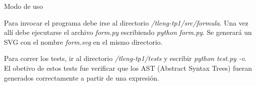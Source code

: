 \begin{section}{Modo de uso}

Para invocar el programa debe irse al directorio \textit{/tleng-tp1/src/formula}. Una vez allí debe ejecutarse el archivo \textit{form.py} escribiendo
\textit{python form.py}. Se generará un SVG con el nombre \textit{form.svg} en el mismo directorio.

Para correr los tests, ir al directorio \textit{/tleng-tp1/tests} y escribir \textit{python test.py -v}. El obetivo de estos tests fue verificar
que los AST (Abstract Syntax Trees) fueran generados correctamente a partir de una expresión.

\end{section}